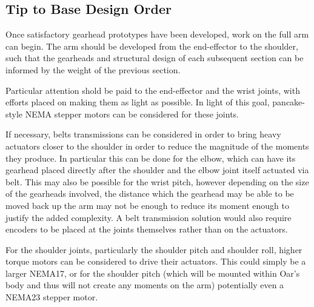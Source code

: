 \documentclass[a4paper,11pt]{article}
\begin{document}
\subsection{Tip to Base Design Order}

Once satisfactory gearhead prototypes have been developed, work on the full arm can begin. The arm should be developed from the end-effector to the shoulder, such that the gearheads and structural design of each subsequent section can be informed by the weight of the previous section.

Particular attention shold be paid to the end-effector and the wrist joints, with efforts placed on making them as light as possible. In light of this goal, pancake-style NEMA stepper motors can be considered for these joints.

If necessary, belts transmissions can be considered in order to bring heavy actuators closer to the shoulder in order to reduce the magnitude of the moments they produce. In particular this can be done for the elbow, which can have its gearhead placed directly after the shoulder and the elbow joint itself actuated via belt. This may also be possible for the wrist pitch, however depending on the size of the gearheads involved, the distance which the gearhead may be able to be moved back up the arm may not be enough to reduce its moment enough to justify the added complexity. A belt transmission solution would also require encoders to be placed at the joints themselves rather than on the actuators.

For the shoulder joints, particularly the shoulder pitch and shoulder roll, higher torque motors can be considered to drive their actuators. This could simply be a larger NEMA17, or for the shoulder pitch (which will be mounted within Oar's body and thus will not create any moments on the arm) potentially even a NEMA23 stepper motor.

\newpage
\printbibliography
\end{document}

